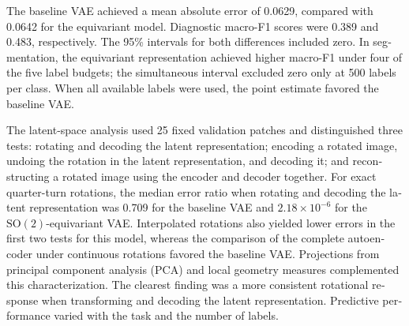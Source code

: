\begin{otherlanguage}{english}
\newpage

The baseline VAE achieved a mean absolute error of 0.0629, compared with 0.0642 for the
equivariant model. Diagnostic macro-F1 scores were 0.389 and 0.483, respectively. The
95\% intervals for both differences included zero. In segmentation, the equivariant
representation achieved higher macro-F1 under four of the five label budgets; the
simultaneous interval excluded zero only at 500 labels per class. When all available
labels were used, the point estimate favored the baseline VAE.

The latent-space analysis used 25 fixed validation patches and distinguished three
tests: rotating and decoding the latent representation; encoding a rotated image,
undoing the rotation in the latent representation, and decoding it; and reconstructing
a rotated image using the encoder and decoder together. For exact quarter-turn
rotations, the median error ratio when rotating and decoding the latent representation
was 0.709 for the baseline VAE and \(2{.}18\times10^{-6}\) for the
\(\mathrm{SO}(2)\)-equivariant VAE.
Interpolated rotations also yielded lower errors in the first two tests for this model,
whereas the comparison of the complete autoencoder under continuous rotations favored
the baseline VAE. Projections from principal component analysis (PCA)
and local geometry measures complemented this characterization. The clearest
finding was a more consistent rotational response when transforming and decoding the
latent representation. Predictive performance varied with the task and the number of
labels.
\endgroup
\end{otherlanguage}
